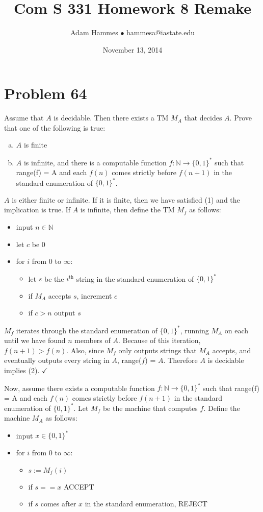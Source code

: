\documentclass[11pt]{article}
\let\imp\rightarrow
\begin{document}
\title{Com S 331 Homework 8 Remake}
\author{Adam Hammes $\bullet$ hammesa@iastate.edu}
\date{November 13, 2014}
\maketitle

\section*{Problem 64}

Assume that $A$ is decidable. 
Then there exists a TM $M_A$ that decides $A$.
Prove that one of the following is true:
\begin{enumerate}[(a)]
	\item $A$ is finite
	\item $A$ is infinite, and there is a computable function $f: \mathbb{N} \imp \{0,1\}^*$ such that range(f) = A and each $f(n)$ comes strictly before $f(n+1)$ in the standard enumeration of $\{0,1\}^*$.
\end{enumerate}

$A$ is either finite or infinite.
If it is finite, then we have satisfied (1) and the implication is true.
If $A$ is infinite, then define the TM $M_f$ as follows:
\begin{itemize}
	\item input $n \in \mathbb{N}$
	\item let $c$ be 0
	\item for $i$ from 0 to $\infty$:
	\begin{itemize}
		\item let $s$ be the $i^{\text{th}}$ string in the standard enumeration of $\{0,1\}^*$
		\item if $M_A$ accepts $s$, increment $c$
		\item if $c > n$ output $s$
	\end{itemize}
\end{itemize}

$M_f$ iterates through the standard enumeration of $\{0,1\}^*$, running $M_A$ on each until we have found $n$ members of $A$.
Because of this iteration, $f( n+ 1) > f(n)$.
Also, since $M_f$ only outputs strings that $M_A$ accepts, and eventually outputs every string in $A$, range($f$) = $A$.
Therefore $A$ is decidable implies (2). $\checkmark$

Now, assume there exists a computable function $f: \mathbb{N} \imp \{0,1\}^*$ such that range(f) = A and each $f(n)$ comes strictly before $f(n+1)$ in the standard enumeration of $\{0,1\}^*$.
Let $M_f$ be the machine that computes $f$.
Define the machine $M_A$ as follows:
\begin{itemize}
	\item input $x \in \{0,1\}^*$
	\item for $i$ from 0 to $\infty$:
	\begin{itemize}
		\item $s := M_f(i)$
		\item if $s == x$ ACCEPT
		\item if $s$ comes after $x$ in the standard enumeration, REJECT
	\end{itemize}
\end{itemize}
\end{document}
